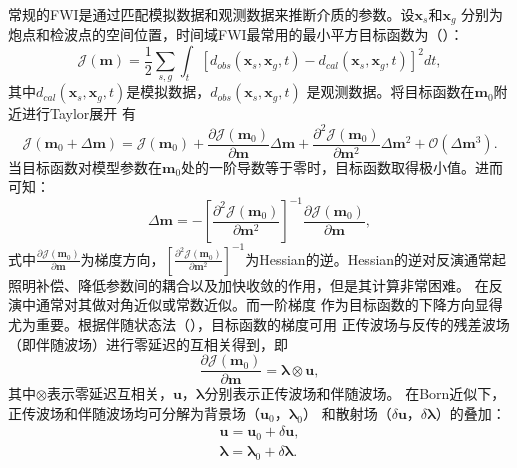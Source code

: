 常规的FWI是通过匹配模拟数据和观测数据来推断介质的参数。设$\mathbf{x}_s$和$\mathbf{x}_g$
分别为炮点和检波点的空间位置，时间域FWI最常用的最小平方目标函数为（）：
\begin{equation}
    \mathcal{J}(\mathbf{m})=\frac{1}{2}\sum_{s,g}\int_t[d_{obs}(\mathbf{x}_s,\mathbf{x}_g,t)
	        -d_{cal}(\mathbf{x}_s,\mathbf{x}_g,t)]^2dt,
	\label{eq:misfit_function}
\end{equation}
其中$d_{cal}(\mathbf{x}_s,\mathbf{x}_g,t)$是模拟数据，$d_{obs}(\mathbf{x}_s,\mathbf{x}_g,t)$
是观测数据。将目标函数在$\mathbf{m}_0$附近进行Taylor展开
有
\begin{equation}
	\mathcal{J}(\mathbf{m}_0+\Delta\mathbf{m})=\mathcal{J}(\mathbf{m}_0)
	+\frac{\partial\mathcal{J}(\mathbf{m}_0)}{\partial\mathbf{m}}\Delta\mathbf{m}
	+\frac{\partial^2\mathcal{J}(\mathbf{m}_0)}{\partial\mathbf{m}^2}\Delta\mathbf{m}^2 
	+ \mathcal{O}(\Delta\mathbf{m}^3).
\end{equation}
当目标函数对模型参数在$\mathbf{m}_0$处的一阶导数等于零时，目标函数取得极小值。进而可知：
\begin{equation}
	\Delta\mathbf{m}=-[\frac{\partial^2\mathcal{J}(\mathbf{m}_0)}{\partial\mathbf{m}^2}]^{-1}
	\frac{\partial\mathcal{J}(\mathbf{m}_0)}{\partial\mathbf{m}},
\end{equation}
式中$\frac{\partial\mathcal{J}(\mathbf{m}_0)}{\partial\mathbf{m}}$为梯度方向，$[\frac{\partial^2
\mathcal{J}(\mathbf{m}_0)}{\partial\mathbf{m}^2}]^{-1}$为Hessian的逆。Hessian的逆对反演通常起
照明补偿、降低参数间的耦合以及加快收敛的作用，但是其计算非常困难。
在反演中通常对其做对角近似或常数近似。而一阶梯度
作为目标函数的下降方向显得尤为重要。根据伴随状态法（），目标函数的梯度可用
正传波场与反传的残差波场（即伴随波场）进行零延迟的互相关得到，即
\begin{equation}
	\frac{\partial\mathcal{J}(\mathbf{m}_0)}{\partial\mathbf{m}} = \mathbf{\lambda}\otimes\mathbf{u},
\end{equation}
其中$\otimes$表示零延迟互相关，$\mathbf{u}$，$\mathbf{\lambda}$分别表示正传波场和伴随波场。
在Born近似下，正传波场和伴随波场均可分解为背景场（$\mathbf{u}_0$，$\mathbf{\lambda}_0$）
和散射场（$\delta\mathbf{u}$，$\delta\mathbf{\lambda}$）的叠加：
\begin{equation}
	\begin{aligned}
	\mathbf{u}=\mathbf{u}_0+\delta\mathbf{u}, \\
	\mathbf{\lambda} = \mathbf{\lambda}_0 + \delta\mathbf{\lambda}.
	\end{aligned}
\end{equation}
